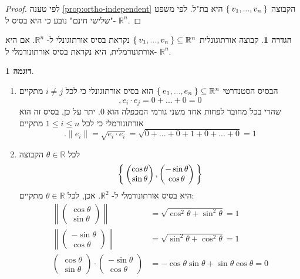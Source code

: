 \documentclass[12pt]{report}
\theoremstyle{plain}
\theoremstyle{definition}
\newtheorem{definition}[theorem]{הגדרה}
\newtheorem{example}{דוגמה}[chapter]
\newcommand{\R}{\mathbb{R}}
\newcommand{\0}{\mathbf{0}}
\begin{document}
\begin{proof}
לפי טענה
\ref{prop:ortho-independent}
הקבוצה
$\Set{v_1,...,v_n}$
היא בת"ל. לפי משפט "שלישי חינם" נובע כי היא בסיס ל-
$\R^n$.
\end{proof}

\begin{definition}
קבוצה אורתוגונלית 
$\Set{v_1,...,v_n}\subseteq\R^n$
נקראת בסיס אורתוגונלי ל-
$\R^n$.
אם היא אורתונורמלית, היא נקראת בסיס אורתונורמלי ל-
$\R^n$.
\end{definition}

\begin{example}\label{ex:rotation-matrix}\
\begin{enumerate}[label=\alph*.]
\item 
הבסיס הסטנדרטי
$\Set{e_1,...,e_n}\subseteq \R^n$
הוא בסיס אורתוגונלי כי לכל
$i\neq j$
מתקיים
$$
,e_i\cdot e_j=0+...+0=0
$$
שהרי בכל מחובר לפחות אחד משני גורמי המכפלה הוא 
$0$.
יתר על כן, בסיס זה הוא אורתונורמלי כי לכל
$1\leq i\leq n$
מתקיים
$$
.\|e_i\|=\sqrt{e_i\cdot e_i}=\sqrt{0+...+0+1+0+...+0}=1
$$


\item 
לכל
$\theta\in\R$
הקבוצה
$$
\Set{\begin{pmatrix}
\cos{\theta} \\
\sin{\theta}
\end{pmatrix},\begin{pmatrix}
-\sin{\theta} \\
\cos{\theta}
\end{pmatrix}}
$$
היא בסיס אורתונורמלי ל-
$\R^2$.
אכן, לכל
$\theta\in\R$
מתקיים:
$$
\begin{aligned}
\left\|\begin{pmatrix}
\cos{\theta} \\
\sin{\theta}
\end{pmatrix}\right\|&=\sqrt{\cos^2\theta+\sin^2\theta}=1 \\
\left\|\begin{pmatrix}
-\sin{\theta} \\
\cos{\theta}
\end{pmatrix}\right\|&=\sqrt{\sin^2\theta+\cos^2\theta}=1 \\
\begin{pmatrix}
\cos{\theta} \\
\sin{\theta}
\end{pmatrix}\cdot\begin{pmatrix}
-\sin{\theta} \\
\cos{\theta}
\end{pmatrix}&=-\cos\theta\sin\theta+\sin\theta\cos\theta=0
\end{aligned}
$$


\end{enumerate}
\end{example}
\end{document}
